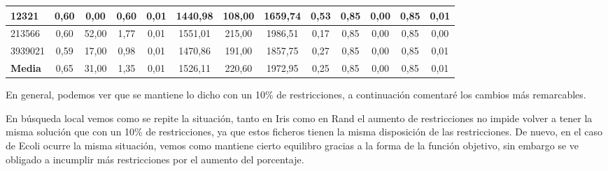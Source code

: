 \documentclass[12pt, spanish]{article}
\begin{document}
\begin{table}[H]
\begin{adjustwidth}{-1cm}{-1cm}
\begin{tabular}{|l|c|c|c|c|c|c|c|c|c|c|c|c|}
12321                                                   & 0,60                         & 0,00                           & 0,60                      & 0,01                   & 1440,98                      & 108,00                         & 1659,74                   & 0,53                   & 0,85                         & 0,00                           & 0,85                      & 0,01                   \\ \hline
213566                                                  & 0,60                         & 52,00                          & 1,77                      & 0,01                   & 1551,01                      & 215,00                         & 1986,51                   & 0,17                   & 0,85                         & 0,00                           & 0,85                      & 0,00                   \\ \hline
3939021                                                 & 0,59                         & 17,00                          & 0,98                      & 0,01                   & 1470,86                      & 191,00                         & 1857,75                   & 0,27                   & 0,85                         & 0,00                           & 0,85                      & 0,01                   \\ \hline
\textbf{Media}                                          & 0,65                         & 31,00                          & 1,35                      & 0,01                   & 1526,11                      & 220,60                         & 1972,95                   & 0,25                   & 0,85                         & 0,00                           & 0,85                      & 0,01                   \\ \hline
\end{tabular}

\end{adjustwidth}

\end{table}

En general, podemos ver que se mantiene lo dicho con un 10\% de restricciones, a continuación comentaré los cambios más remarcables.

En búsqueda local vemos como se repite la situación, tanto en Iris como en Rand el aumento de restricciones no impide volver a tener la misma solución que con un 10\% de restricciones, ya que estos ficheros tienen la misma disposición de las restricciones. De nuevo, en el caso de Ecoli ocurre la misma situación, vemos como mantiene cierto equilibro gracias a la forma de la función objetivo, sin embargo se ve obligado a incumplir más restricciones por el aumento del porcentaje.
\end{document}
